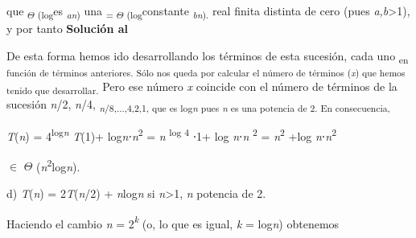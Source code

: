 \documentclass[12pt]{article}
\renewcommand{\_}{\kern-1.5pt\textunderscore\kern-1.5pt}
\begin{document}
{\fontsize{10pt}{12.0pt}\selectfont que \textsubscript{$ \Theta $ (log}es \textit{\textsubscript{an}}\textsubscript{) }una \textsubscript{= $ \Theta $ (log}constante \textit{\textsubscript{bn}}\textsubscript{). }real finita distinta de cero (pues \textit{a,b}>1), y por tanto \textbf{Solución al }\par}\par

\begin{adjustwidth}{0.58in}{0.57in}
{\fontsize{10pt}{12.0pt}\selectfont De esta forma hemos ido desarrollando los términos de esta sucesión, cada uno \textsubscript{en función de términos anteriores. Sólo nos queda por calcular el número de términos (\textit{x}) que hemos tenido que desarrollar. }Pero ese número \textit{x }coincide con el número de términos de la sucesión \textit{n}/2, \textit{n}/4, \textit{\textsubscript{n}}\textsubscript{/8,...,4,2,1, que es log\textit{n }pues \textit{n }es una potencia de 2. En consecuencia, }\par}\par

\end{adjustwidth}

\begin{adjustwidth}{0.63in}{0.61in}
\textit{T}(\textit{n}) = 4\textsuperscript{log\textit{n }}\textit{T}(1)+ log\textit{n}⋅\textit{n}\textsuperscript{2 }= \textit{n }\textsuperscript{log 4 }⋅1+ log \textit{n}⋅\textit{n }\textsuperscript{2 }= \textit{n}\textsuperscript{2 }+log \textit{n}⋅\textit{n}\textsuperscript{2}{\fontsize{10pt}{12.0pt}\selectfont $ \in $ $ \Theta $ (\textit{n}\textsuperscript{2}log\textit{n}). \par}\par

\end{adjustwidth}

\begin{adjustwidth}{0.58in}{2.66in}
{\fontsize{10pt}{12.0pt}\selectfont d) \textit{T}(\textit{n}) = 2\textit{T}(\textit{n}/2) + \textit{n}log\textit{n }si \textit{n}>1, \textit{n }potencia de 2. \par}\par

\end{adjustwidth}

\begin{adjustwidth}{0.57in}{1.61in}
{\fontsize{10pt}{12.0pt}\selectfont Haciendo el cambio \textit{n }= 2\textit{\textsuperscript{k }}(o, lo que es igual, \textit{k }= log\textit{n}) obtenemos \par}\par

\end{adjustwidth}
\end{document}
